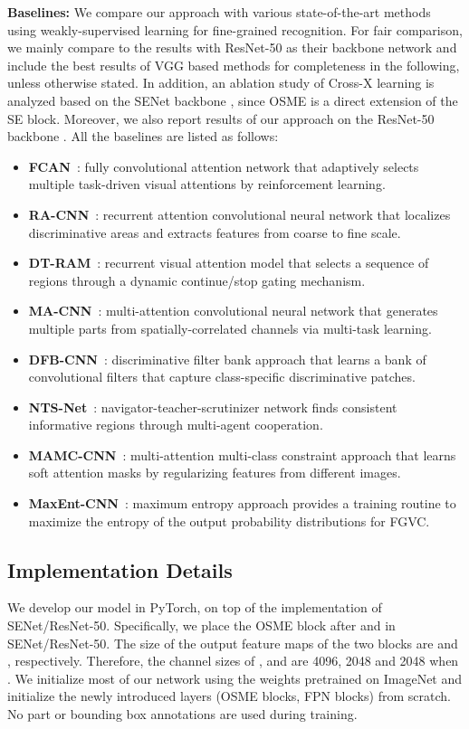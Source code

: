 \documentclass[10pt,twocolumn,letterpaper]{article}
\begin{document}
\textbf{Baselines:} We compare our approach with various state-of-the-art methods using weakly-supervised learning for fine-grained recognition. For fair comparison, we mainly compare to the results with ResNet-50 as their backbone network and include the best results of VGG based methods for completeness in the following, unless otherwise stated. 
In addition, an ablation study of Cross-X learning is analyzed based on the SENet backbone \cite{senet17cvpr}, since OSME is a direct extension of the SE block. Moreover, we also report results of our approach on the ResNet-50 backbone \cite{resnet16kaiming}.
All the baselines are listed as follows:
\begin{itemize}
\itemsep0em 
\item \textbf{FCAN}~\cite{fcan@lin}: fully convolutional attention network that adaptively selects multiple task-driven visual attentions by reinforcement learning.
\item \textbf{RA-CNN}~\cite{racnn@mei}: recurrent attention  convolutional neural network that localizes discriminative areas and extracts features from coarse to fine scale.
\item \textbf{DT-RAM}~\cite{ram@arxiv}: recurrent visual attention model that selects a sequence of regions through a dynamic continue/stop gating mechanism. 
\item \textbf{MA-CNN}~\cite{macnn@mei}: multi-attention convolutional neural network that generates multiple parts from spatially-correlated channels via multi-task learning.
\item \textbf{DFB-CNN}~\cite{dfbnet18larry}: discriminative filter bank approach that learns a bank of convolutional filters that capture class-specific discriminative patches.
\item \textbf{NTS-Net}~\cite{ntscnn@eccv}: navigator-teacher-scrutinizer network finds consistent informative regions through multi-agent cooperation. 
\item \textbf{MAMC-CNN}~\cite{mamc18eccv}: multi-attention multi-class constraint approach that learns soft attention masks by regularizing features from different images.
\item \textbf{MaxEnt-CNN}~\cite{maxent@nips}: maximum entropy approach provides a training routine to maximize the entropy of the output probability distributions for FGVC.
\end{itemize}


\subsection{Implementation Details}
\label{sec:iplt}
We develop our model in PyTorch, on top of the implementation of SENet/ResNet-50.
Specifically, we place the OSME block after  and  in SENet/ResNet-50.
The size of the output feature maps of the two blocks are  and , respectively.
Therefore, the channel sizes of ,  and  are 4096, 2048 and 2048 when . 
We initialize most of our network using the weights pretrained on ImageNet and initialize the newly introduced layers (OSME blocks, FPN blocks) from scratch.
No part or bounding box annotations are used during training.
\end{document}
